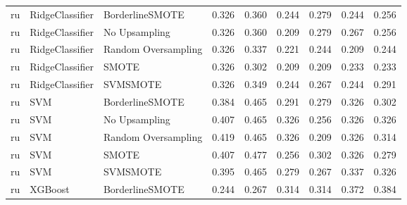 \begin{tabular}{lllllllll}
      ru &              RidgeClassifier &     BorderlineSMOTE &     0.326 &                     0.360 &                 0.244 &                  0.279 &                                   0.244 &     0.256 \\
      ru &              RidgeClassifier &       No Upsampling &     0.326 &                     0.360 &                 0.209 &                  0.279 &                                   0.267 &     0.256 \\
      ru &              RidgeClassifier & Random Oversampling &     0.326 &                     0.337 &                 0.221 &                  0.244 &                                   0.209 &     0.244 \\
      ru &              RidgeClassifier &               SMOTE &     0.326 &                     0.302 &                 0.209 &                  0.209 &                                   0.233 &     0.233 \\
      ru &              RidgeClassifier &            SVMSMOTE &     0.326 &                     0.349 &                 0.244 &                  0.267 &                                   0.244 &     0.291 \\
      ru &                          SVM &     BorderlineSMOTE &     0.384 &                     0.465 &                 0.291 &                  0.279 &                                   0.326 &     0.302 \\
      ru &                          SVM &       No Upsampling &     0.407 &                     0.465 &                 0.326 &                  0.256 &                                   0.326 &     0.326 \\
      ru &                          SVM & Random Oversampling &     0.419 &                     0.465 &                 0.326 &                  0.209 &                                   0.326 &     0.314 \\
      ru &                          SVM &               SMOTE &     0.407 &                     0.477 &                 0.256 &                  0.302 &                                   0.326 &     0.279 \\
      ru &                          SVM &            SVMSMOTE &     0.395 &                     0.465 &                 0.279 &                  0.267 &                                   0.337 &     0.326 \\
      ru &                      XGBoost &     BorderlineSMOTE &     0.244 &                     0.267 &                 0.314 &                  0.314 &                                   0.372 &     0.384 \\

\end{tabular}
